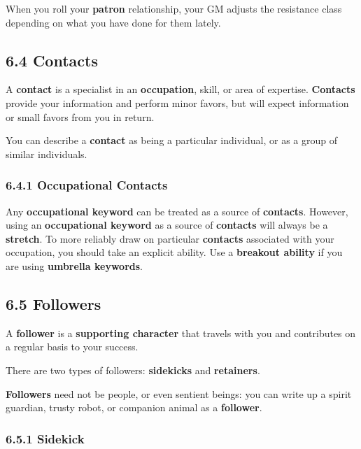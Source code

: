 \documentclass[
]{article}
\begin{document}
When you roll your \textbf{patron} relationship, your GM adjusts the
resistance class depending on what you have done for them lately.

\hypertarget{contacts}{%
\subsection{6.4 Contacts}\label{contacts}}

A \textbf{contact} is a specialist in an \textbf{occupation}, skill, or
area of expertise. \textbf{Contacts} provide your information and
perform minor favors, but will expect information or small favors from
you in return.

You can describe a \textbf{contact} as being a particular individual, or
as a group of similar individuals.

\hypertarget{occupational-contacts}{%
\subsubsection{6.4.1 Occupational
Contacts}\label{occupational-contacts}}

Any \textbf{occupational keyword} can be treated as a source of
\textbf{contacts}. However, using an \textbf{occupational keyword} as a
source of \textbf{contacts} will always be a \textbf{stretch}. To more
reliably draw on particular \textbf{contacts} associated with your
occupation, you should take an explicit ability. Use a \textbf{breakout
ability} if you are using \textbf{umbrella keywords}.

\hypertarget{followers-1}{%
\subsection{6.5 Followers}\label{followers-1}}

A \textbf{follower} is a \textbf{supporting character} that travels with
you and contributes on a regular basis to your success.

There are two types of followers: \textbf{sidekicks} and
\textbf{retainers}.

\textbf{Followers} need not be people, or even sentient beings: you can
write up a spirit guardian, trusty robot, or companion animal as a
\textbf{follower}.

\hypertarget{sidekick}{%
\subsubsection{6.5.1 Sidekick}\label{sidekick}}
\end{document}
